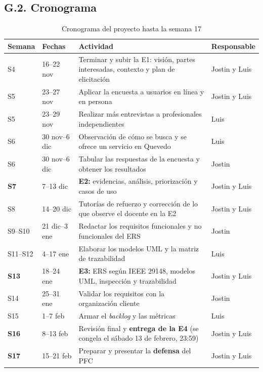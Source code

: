 \documentclass[11pt,a4paper]{article}
\renewcommand{\arraystretch}{1.22}
\begin{document}
\subsection*{G.2. Cronograma}
\begin{table}[H]
\centering
\caption{Cronograma del proyecto hasta la semana 17}
\label{tab:cronograma}
\footnotesize
\renewcommand{\arraystretch}{1.12}
\begin{tabularx}{\textwidth}{|C{1.4cm}|L{2.1cm}|Y|L{2.2cm}|}
\hline
{}
\textbf{Semana} & \textbf{Fechas} & \textbf{Actividad} & \textbf{Responsable} \\
\hline
S4 & 16--22 nov & Terminar y subir la E1: visi\'on, partes interesadas, contexto y plan de elicitaci\'on & Jostin y Luis \\
\hline
S5 & 23--27 nov & Aplicar la encuesta a usuarios en l\'inea y en persona & Jostin y Luis \\
\hline
S5 & 23--29 nov & Realizar m\'as entrevistas a profesionales independientes & Luis \\
\hline
S6 & 30 nov--6 dic & Observaci\'on de c\'omo se busca y se ofrece un servicio en Quevedo & Luis \\
\hline
S6 & 30 nov--6 dic & Tabular las respuestas de la encuesta y obtener los resultados & Jostin \\
\hline
\textbf{S7} & 7--13 dic & \textbf{E2:} evidencias, an\'alisis, priorizaci\'on y casos de uso & Jostin y Luis \\
\hline
S8 & 14--20 dic & Tutor\'ias de refuerzo y correcci\'on de lo que observe el docente en la E2 & Jostin y Luis \\
\hline
S9--S10 & 21 dic--3 ene & Redactar los requisitos funcionales y no funcionales del ERS & Jostin \\
\hline
S11--S12 & 4--17 ene & Elaborar los modelos UML y la matriz de trazabilidad & Luis \\
\hline
\textbf{S13} & 18--24 ene & \textbf{E3:} ERS seg\'un IEEE 29148, modelos UML, inspecci\'on y trazabilidad & Jostin y Luis \\
\hline
S14 & 25--31 ene & Validar los requisitos con la organizaci\'on cliente & Jostin \\
\hline
S15 & 1--7 feb & Armar el \emph{backlog} y las m\'etricas & Luis \\
\hline
\textbf{S16} & 8--13 feb & Revisi\'on final y \textbf{entrega de la E4} (se congela el s\'abado 13 de febrero, 23:59) & Jostin y Luis \\
\hline
\textbf{S17} & 15--21 feb & Preparar y presentar la \textbf{defensa} del PFC & Jostin y Luis \\
\hline
\end{tabularx}
\end{table}
\end{document}
